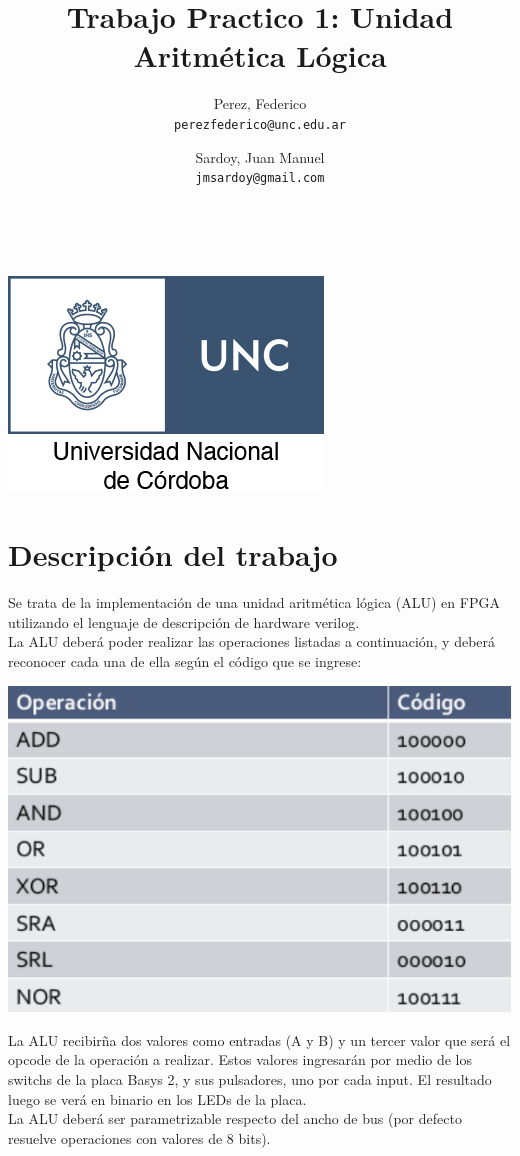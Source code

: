 \documentclass{article}
\title{Trabajo Practico 1: Unidad Aritmética Lógica}
\author{Perez, Federico\\
        \texttt{perezfederico@unc.edu.ar}
        \and 
        Sardoy, Juan Manuel\\
        \texttt{jmsardoy@gmail.com}
        }
\begin{document}
\maketitle
\\
\begin{center}
    \includegraphics[scale=2]{unc-logo}
\end{center}
\newpage
\section{Descripción del trabajo}

Se trata de la implementación de una unidad aritmética lógica (ALU) en FPGA
utilizando el lenguaje de descripción de hardware verilog.\\
\indent La ALU deberá poder realizar las operaciones listadas a continuación, y
deberá reconocer cada una de ella según el código que se ingrese:\\ 

\begin{center}
    \includegraphics[scale=0.5]{opcodes}
\end{center}

\indent La ALU recibirña dos valores como entradas (A y B) y un tercer valor
que será el opcode de la operación a realizar. Estos valores ingresarán por
medio de los switchs de la placa Basys 2, y sus pulsadores, uno por cada input.
El resultado luego se verá en binario en los LEDs de la placa.\\
\indent La ALU deberá ser parametrizable respecto del ancho de bus (por defecto
resuelve operaciones con valores de 8 bits).
\end{document}
